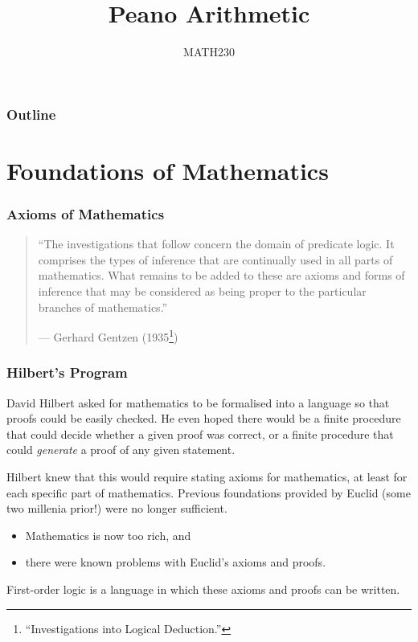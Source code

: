 \documentclass{beamer}
\title{Peano Arithmetic}
\author{MATH230}
\institute{Te Kura P\=angarau \\ Te Whare W\=ananga o Waitaha}
\date{}
\theoremstyle{indentDefn} \newtheorem{defn}[]{Definition}
\begin{document}
\begin{frame}

  \titlepage

\end{frame}

\begin{frame}
  \frametitle{Outline}

  \tableofcontents

\end{frame}

\section{Foundations of Mathematics}

\begin{frame}
	\frametitle{Axioms of Mathematics}

	\begin{quote}
		``The investigations that follow concern the domain of predicate logic. It comprises the types of inference that are continually used in all parts of mathematics. What remains to be added to these are axioms and forms of inference that may be considered as being proper to the particular branches of mathematics.''
		\begin{flushright}
			--- Gerhard Gentzen (1935\footnote{``Investigations into Logical Deduction.''})
		\end{flushright}
	\end{quote}

\end{frame}

\begin{frame}
	\frametitle{Hilbert's Program}
	
	David Hilbert asked for mathematics to be formalised into a language so that proofs could be easily checked. He even hoped there would be a finite procedure that could decide whether a given proof was correct, or a finite procedure that could \textit{generate} a proof of any given statement. 
	
	\vspace{0.2cm}
	
	Hilbert knew that this would require stating axioms for mathematics, at least for each specific part of mathematics. Previous foundations provided by Euclid (some two millenia prior!) were no longer sufficient.
	
	\vspace{0.2cm}
	
	\begin{itemize}
		\item Mathematics is now too rich, and 
		\item there were known problems with Euclid's axioms and proofs. 
	\end{itemize}

	\vspace{0.2cm}
	
	First-order logic is a language in which these axioms and proofs can be written. 
	
\end{frame}
\end{document}
